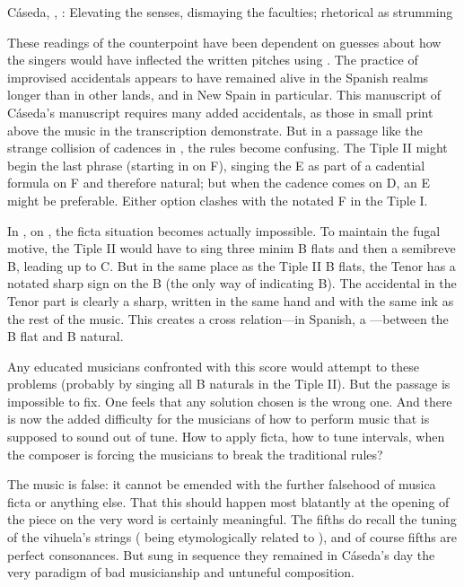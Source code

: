 {Cáseda, , : Elevating the senses,
dismaying the faculties; rhetorical  as strumming}


These readings of the counterpoint have been dependent on guesses about how the
singers would have inflected the written pitches using .
The practice of improvised accidentals appears to have remained alive in the
Spanish realms longer than in other lands, and in New Spain in particular. 
This manuscript of Cáseda's manuscript requires many added accidentals, as
those in small print above the music in the transcription demonstrate.
But in a passage like the strange collision of cadences in ,
the rules become confusing.
The Tiple II might begin the last phrase (starting in  on F),
singing the E as part of a cadential formula on F and therefore natural; but
when the cadence comes on D, an E\fl{} might be preferable. 
Either option clashes with the notated F\sh{} in the Tiple I.

In , on , the ficta situation becomes
actually impossible.
To maintain the fugal motive, the Tiple II would have to sing three minim B
flats and then a semibreve B\na, leading up to C.
But in the same place as the Tiple II B flats, the Tenor has a notated sharp
sign on the B (the only way of indicating B\na).
The accidental in the Tenor part is clearly a sharp, written in the same hand
and with the same ink as the rest of the music.
This creates a cross relation---in Spanish, a ---between
the B flat and B natural.

Any educated musicians confronted with this score would attempt to 
these problems (probably by singing all B naturals in the Tiple II).
But the passage is impossible to fix.
One feels that any solution chosen is the wrong one.
And there is now the added difficulty for the musicians of how to perform music
that is supposed to sound out of tune.
How to apply ficta, how to tune intervals, when the composer is forcing the
musicians to break the traditional rules?

The music is false: it cannot be emended with the further falsehood of musica
ficta or anything else.
That this should happen most blatantly at the opening of the piece on the very
word  is certainly meaningful.
The fifths do recall the tuning of the vihuela's strings (
being etymologically related to ), and of course fifths are
perfect consonances.
But sung in sequence they remained in Cáseda's day the very paradigm of bad
musicianship and untuneful composition.

